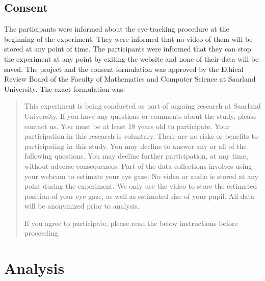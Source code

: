 \subsection{Consent}
The participants were informed about the eye-tracking procedure at the beginning of the experiment. They were informed that no video of them will be stored at any point of time. The participants were informed that they can stop the experiment at any point by exiting the website and none of their data will be saved. The project and the consent formulation was approved by the Ethical Review Board of the Faculty of Mathematics and Computer Science at Saarland University. The exact formulation was: 

\begin{quote}
    This experiment is being conducted as part of ongoing research at Saarland University. If you have any questions or comments about the study, please contact us. You must be at least 18 years old to participate. Your participation in this research is voluntary. There are no risks or benefits to participating in this study. You may decline to answer any or all of the following questions. You may decline further participation, at any time, without adverse consequences. Part of the data collections involves using your webcam to estimate your eye gaze. No video or audio is stored at any point during the experiment. We only use the video to store the estimated position of your eye gaze, as well as estimated size of your pupil. All data will be anonymized prior to analysis. 

    If you agree to participate, please read the below instructions before proceeding.
\end{quote}


\section{Analysis}
\label{sec:analysis}

